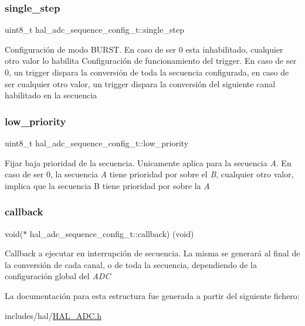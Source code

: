 \subsubsection{\texorpdfstring{single\+\_\+step}{single\_step}}
{\footnotesize\ttfamily uint8\+\_\+t hal\+\_\+adc\+\_\+sequence\+\_\+config\+\_\+t\+::single\+\_\+step}

Configuración de modo B\+U\+R\+ST. En caso de ser 0 esta inhabilitado, cualquier otro valor lo habilita Configuración de funcionamiento del trigger. En caso de ser 0, un trigger dispara la conversión de toda la secuencia configurada, en caso de ser cualquier otro valor, un trigger dispara la conversión del siguiente canal habilitado en la secuencia \mbox{\label{structhal__adc__sequence__config__t_a1dc8fcb4920ed109389a6391e8c1c9ef}} 
\subsubsection{\texorpdfstring{low\+\_\+priority}{low\_priority}}
{\footnotesize\ttfamily uint8\+\_\+t hal\+\_\+adc\+\_\+sequence\+\_\+config\+\_\+t\+::low\+\_\+priority}

Fijar baja prioridad de la secuencia. Unicamente aplica para la secuencia {\itshape A}. En caso de ser 0, la secuencia {\itshape A} tiene prioridad por sobre el {\itshape B}, cualquier otro valor, implica que la secuencia B tiene prioridad por sobre la {\itshape A} \mbox{\label{structhal__adc__sequence__config__t_a42710517a48ebba1b95e66e9f005cf7d}} 
\subsubsection{\texorpdfstring{callback}{callback}}
{\footnotesize\ttfamily void($\ast$ hal\+\_\+adc\+\_\+sequence\+\_\+config\+\_\+t\+::callback) (void)}

Callback a ejecutar en interrupción de secuencia. La misma se generará al final de la conversión de cada canal, o de toda la secuencia, dependiendo de la configuración global del {\itshape A\+DC} 

La documentación para esta estructura fue generada a partir del siguiente fichero\+:\begin{DoxyCompactItemize}
\item 
includes/hal/\hyperlink{HAL__ADC_8h}{H\+A\+L\+\_\+\+A\+D\+C.\+h}\end{DoxyCompactItemize}
